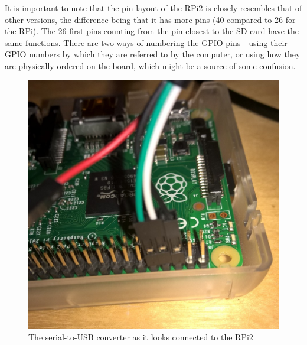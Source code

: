 \documentclass[a4paper,11pt,reqno]{amsart}
\begin{document}
It is important to note that the pin layout of the RPi2 is closely resembles that of other versions, the difference being that it has more pins (40 compared to 26 for the RPi). The 26 first pins counting from the pin closest to the SD card have the same functions. There are two ways of numbering the GPIO pins - using their GPIO numbers by which they are referred to by the computer, or using how they are physically ordered on the board, which might be a source of some confusion.
\begin{figure}[hb]
\begin{center}
   \includegraphics[scale=0.3]{connection.png}
 \end{center}
 \caption{The serial-to-USB converter as it looks connected to the RPi2}
 \label{fig:conn}
\end{figure}
\end{document}
